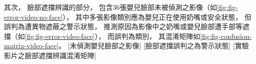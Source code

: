 \documentclass[class=NCU_thesis, crop=false]{standalone}
\begin{document}
其次，
臉部遮擋辨識的部分，
包含36張嬰兒臉部未被偵測之影像（如\cref{fig:fig-error-video-no-face}），
其中多張影像類別應為嬰兒正在使用奶嘴或安全狀態，
但誤判為遭異物遮蔽之警示狀態，
推測原因為影像中之奶嘴或嬰兒臉部遭手部等遮擋（如\cref{fig:fig-error-video-face}），
而誤判為類別，
其混淆矩陣如\cref{fig:fig-confusion-matrix-video-face}。
[未偵測嬰兒臉部之影像]
[臉部遮擋誤判之為警示狀態]
[實驗影片之臉部遮擋辨識混淆矩陣]
\end{document}
